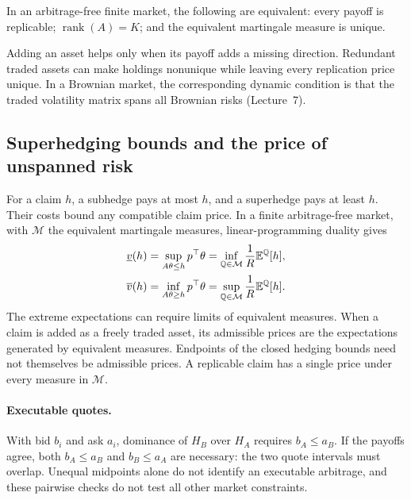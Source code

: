 \begin{theorem}
In an arbitrage-free finite market, the following are equivalent:
every payoff is replicable; \(\operatorname{rank}(A)=K\); and the
equivalent martingale measure is unique.
\end{theorem}
Adding an asset helps only when its payoff adds a missing direction.
Redundant traded assets can make holdings nonunique while leaving every
replication price unique. In a Brownian market, the corresponding dynamic
condition is that the traded volatility matrix spans all Brownian risks
(Lecture~7).

\subsection{Superhedging bounds and the price of unspanned risk}
For a claim \(h\), a subhedge pays at most \(h\), and a superhedge pays
at least \(h\). Their costs bound any compatible claim price. In a finite
arbitrage-free market, with \(\mathcal M\) the equivalent martingale
measures, linear-programming duality gives
\[
\begin{aligned}
\underline v(h)
&=\sup_{A\theta\leq h}p^\top\theta
=\inf_{\mathbb{Q}\in\mathcal M}\frac1R\mathbb{E}^{\mathbb{Q}}[h],\\
\overline v(h)
&=\inf_{A\theta\geq h}p^\top\theta
=\sup_{\mathbb{Q}\in\mathcal M}\frac1R\mathbb{E}^{\mathbb{Q}}[h].
\end{aligned}
\]
The extreme expectations can require limits of equivalent measures. When
a claim is added as a freely traded asset, its admissible prices are the
expectations generated by equivalent measures. Endpoints of the closed
hedging bounds need not themselves be admissible prices. A replicable
claim has a single price under every measure in \(\mathcal M\).

\paragraph{Executable quotes.}
With bid \(b_i\) and ask \(a_i\), dominance of \(H_B\) over \(H_A\)
requires \(b_A\leq a_B\). If the payoffs agree, both
\(b_A\leq a_B\) and \(b_B\leq a_A\) are necessary: the two quote
intervals must overlap. Unequal midpoints alone do not identify an
executable arbitrage, and these pairwise checks do not test all other
market constraints.

